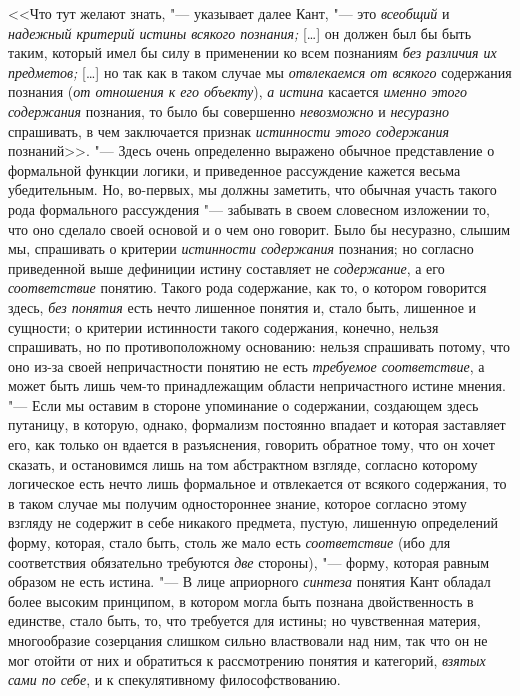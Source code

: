 <<Что тут желают знать, "--- указывает далее Кант,
"--- это {\em всеобщий} и {\em надежный критерий
истины всякого познания;} [\ldots] он должен был бы быть таким,
который имел бы силу в применении ко всем познаниям
{\em без различия их предметов;} [\ldots] но так как в таком случае мы
{\em отвлекаемся от всякого} содержания познания
({\em от отношения к его объекту}), {\em а истина} касается
{\em именно этого содержания} познания, то было бы совершенно
{\em невозможно} и {\em несуразно} спрашивать, в чем заключается признак
{\em истинности этого содержания} познаний>>.
"--- Здесь очень определенно выражено обычное представление о
формальной функции логики, и приведенное рассуждение кажется весьма
убедительным. Но, во-первых, мы должны заметить, что обычная участь такого
рода формального рассуждения "--- забывать в своем словесном
изложении то, что оно сделало своей основой и о чем оно говорит. Было бы
несуразно, слышим мы, спрашивать о критерии {\em истинности содержания}
познания; но согласно приведенной выше дефиниции истину
составляет не {\em содержание}, а его {\em соответствие}
понятию. Такого рода содержание, как то, о котором говорится
здесь, {\em без понятия} есть нечто лишенное понятия и, стало быть,
лишенное и сущности; о критерии истинности такого содержания, конечно,
нельзя спрашивать, но по противоположному основанию: нельзя спрашивать
потому, что оно из-за своей непричастности понятию не есть
{\em требуемое соответствие},
а может быть лишь чем-то принадлежащим области непричастного
истине мнения. "--- Если мы оставим в стороне упоминание о
содержании, создающем здесь путаницу, в которую, однако, формализм
постоянно впадает и которая заставляет его, как только он вдается в
разъяснения, говорить обратное тому, что он хочет сказать, и остановимся
лишь на том абстрактном взгляде, согласно которому логическое есть нечто
лишь формальное и отвлекается от всякого содержания, то в таком случае мы
получим одностороннее знание, которое согласно этому взгляду не содержит в
себе никакого предмета, пустую, лишенную определений форму, которая, стало
быть, столь же мало есть {\em соответствие} (ибо
для соответствия обязательно требуются {\em две} стороны), "---
форму, которая равным образом не есть истина. "---
В лице априорного {\em синтеза} понятия
Кант обладал более высоким принципом, в котором могла быть познана
двойственность в единстве, стало быть, то, что требуется для истины; но
чувственная материя, многообразие созерцания слишком сильно властвовали над
ним, так что он не мог отойти от них и обратиться к рассмотрению понятия и
категорий, {\em взятых сами по себе}, и к спекулятивному философствованию.

